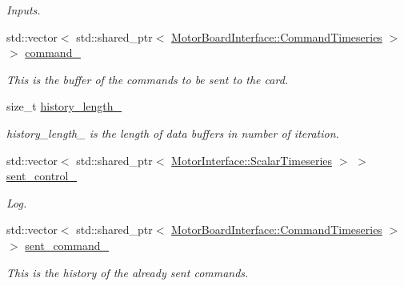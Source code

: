 \begin{DoxyCompactItemize}
\begin{DoxyCompactList}\small\item\em Inputs. \end{DoxyCompactList}\item 
\mbox{\label{classblmc__drivers_1_1SpiBus_a0dadae58644afb41beba8df8f9f09727}} 
std\+::vector$<$ std\+::shared\+\_\+ptr$<$ \hyperlink{classblmc__drivers_1_1MotorBoardInterface_ae2afe94a023d9f08a4c689e9b7660f15}{Motor\+Board\+Interface\+::\+Command\+Timeseries} $>$ $>$ \hyperlink{classblmc__drivers_1_1SpiBus_a0dadae58644afb41beba8df8f9f09727}{command\+\_\+}
\begin{DoxyCompactList}\small\item\em This is the buffer of the commands to be sent to the card. \end{DoxyCompactList}\item 
\mbox{\label{classblmc__drivers_1_1SpiBus_a8d0b70b8d02c386d436051a571930c58}} 
size\+\_\+t \hyperlink{classblmc__drivers_1_1SpiBus_a8d0b70b8d02c386d436051a571930c58}{history\+\_\+length\+\_\+}
\begin{DoxyCompactList}\small\item\em history\+\_\+length\+\_\+ is the length of data buffers in number of iteration. \end{DoxyCompactList}\item 
std\+::vector$<$ std\+::shared\+\_\+ptr$<$ \hyperlink{classblmc__drivers_1_1MotorInterface_a49b8fc916b9f9debbd7b0988463db5cd}{Motor\+Interface\+::\+Scalar\+Timeseries} $>$ $>$ \hyperlink{classblmc__drivers_1_1SpiBus_a9c17b8887fc58ca1d5bfb1d5c2fd1e8a}{sent\+\_\+control\+\_\+}
\begin{DoxyCompactList}\small\item\em Log. \end{DoxyCompactList}\item 
\mbox{\label{classblmc__drivers_1_1SpiBus_aa0e964e18db278c1d281d1406ff6d42a}} 
std\+::vector$<$ std\+::shared\+\_\+ptr$<$ \hyperlink{classblmc__drivers_1_1MotorBoardInterface_ae2afe94a023d9f08a4c689e9b7660f15}{Motor\+Board\+Interface\+::\+Command\+Timeseries} $>$ $>$ \hyperlink{classblmc__drivers_1_1SpiBus_aa0e964e18db278c1d281d1406ff6d42a}{sent\+\_\+command\+\_\+}
\begin{DoxyCompactList}\small\item\em This is the history of the already sent commands. \end{DoxyCompactList}\item 

\end{DoxyCompactItemize}
